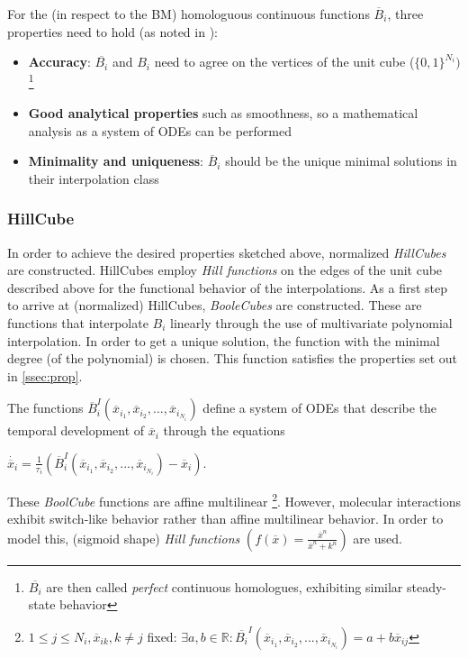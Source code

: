 \documentclass[11pt]{article}
\begin{document}
For the (in respect to the BM) homologuous continuous functions $\overline{B}_{i}$, three properties need to hold (as noted in \cite{Wittmann}):
\begin{itemize}
	\item \textbf{Accuracy}: $\overline{B_{i}}$ and $B_{i}$ need to agree on the vertices of the unit cube ($\{0,1\}^{N_{i}})$ \footnote{$\overline{B_{i}}$ are then called \textit{perfect} continuous homologues, exhibiting similar steady-state behavior}
	\item \textbf{Good analytical properties} such as smoothness, so a mathematical analysis as a system of ODEs can be performed
	\item \textbf{Minimality and uniqueness}: $\overline{B}_{i}$ should be the unique minimal solutions in their interpolation class
\end{itemize}

\subsubsection{HillCube} \label{sssec:Hillcube}
In order to achieve the desired properties sketched above, normalized \textit{HillCubes} are constructed. HillCubes employ \textit{Hill functions} on the edges of the unit cube described above for the functional behavior of the interpolations.
As a first step to arrive at (normalized) HillCubes, \textit{BooleCubes} are constructed. These are functions that interpolate $B_{i}$ linearly through the use of multivariate polynomial interpolation. In order to get a unique solution,
the function with the minimal degree (of the polynomial) is chosen. This function satisfies the properties set out in \ref{ssec:prop}.

The functions $\overline{B}_{i}^{I} (\overline{x}_{i_{1}}, \overline{x}_{i_{2}},..., \overline{x}_{i_{N_{i}}} )$ define a system of ODEs that describe the temporal development of $\overline{x}_{i}$ through the equations 

$\dot{\overline{x}_{i}} = \frac{1}{\tau_{i}} (\overline{B}_{i}^{I} (\overline{x}_{i_{1}}, \overline{x}_{i_{2}},..., \overline{x}_{i_{N_{i}}}) - \overline{x}_{i} )$.

These \textit{BoolCube} functions are affine multilinear \footnote{$1 \leq j \leq N_{i} , \overline{x}_{ik}, k \neq j$ fixed: $ \exists a, b \in \mathbb{R} : \overline{B_{i}}^{I} (\overline{x}_{i_{1}}, \overline{x}_{i_{2}},..., \overline{x}_{i_{N_{i}}} ) = a + b \overline{x}_{ij}$}.
However, molecular interactions exhibit switch-like behavior rather than affine multilinear behavior. In order to model this, (sigmoid shape) \textit{Hill functions} $(f(\overline{x}) = \frac{\overline{x}^{n}}{ \overline{x}^{n} + k^{n}} )$ are used.
\end{document}
